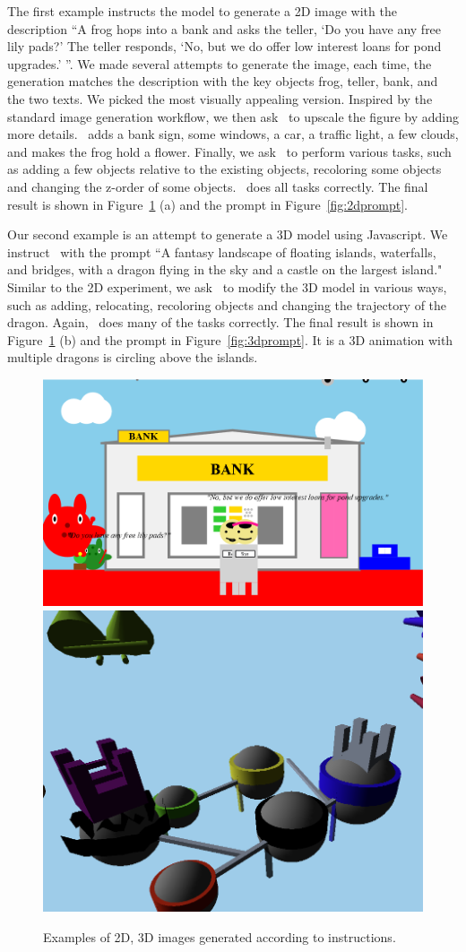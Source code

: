 The first example instructs the model to generate a 2D image with the description ``A frog hops into a bank and asks the teller, `Do you have any free lily pads?' The teller responds, `No, but we do offer low interest loans for pond upgrades.' ''. We made several attempts to generate the image, each time, the generation matches the description with the key objects frog, teller, bank, and the two texts. We picked the most visually appealing version. Inspired by the standard image generation workflow, we then ask \DV\ to upscale the figure by adding more details. \DV\ adds a bank sign, some windows, a car, a traffic light, a few clouds, and makes the frog hold a flower. Finally, we ask \DV\ to perform various tasks, such as adding a few objects relative to the existing objects, recoloring some objects and changing the z-order of some objects. \DV\ does all tasks correctly. The final result is shown in Figure~\ref{fig:multimodelinstr} (a) and the prompt in Figure~\ref{fig:2dprompt}.
\newline

Our second example is an attempt to generate a 3D model using Javascript. We instruct \DV\ with the prompt ``A fantasy landscape of floating islands, waterfalls, and bridges, with a dragon flying in the sky and a castle on the largest island." Similar to the 2D experiment, we ask \DV\ to modify the 3D model in various ways, such as adding, relocating, recoloring objects and changing the trajectory of the dragon. Again, \DV\ does many of the tasks correctly. The final result is shown in Figure~\ref{fig:multimodelinstr} (b) and the prompt in Figure~\ref{fig:3dprompt}. It is a 3D animation with multiple dragons is circling above the islands.

\begin{figure}[H]
	\centering
	\includegraphics[height=0.3\textwidth]{Section 2/bank.png}
	\hspace{0.1in}
	\includegraphics[height=0.3\textwidth]{Section 2/island.png}
	\caption{Examples of 2D, 3D images generated according to instructions.}
	\label{fig:multimodelinstr}
\end{figure}

